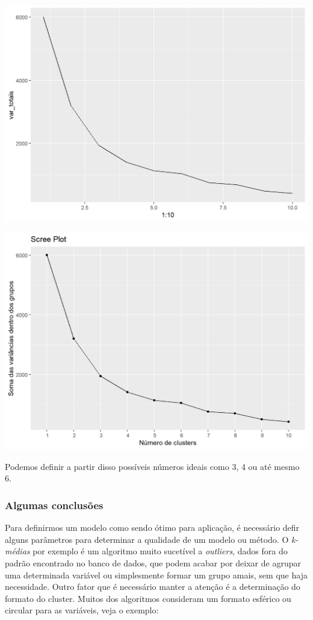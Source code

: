 \documentclass[
  letterpaper,
  DIV=11,
  numbers=noendperiod]{scrreprt}
\begin{document}
\includegraphics{./figuras_naosupervisionado/unnamed-chunk-17-1.png}

\includegraphics{./figuras_naosupervisionado/unnamed-chunk-17-2.png}

Podemos definir a partir disso possíveis números ideais como 3, 4 ou até
mesmo 6.

\hypertarget{algumas-conclusuxf5es-1}{%
\subsubsection{Algumas conclusões}\label{algumas-conclusuxf5es-1}}

Para definirmos um modelo como sendo ótimo para aplicação, é necessário
defir alguns parâmetros para determinar a qualidade de um modelo ou
método. O \emph{k-médias} por exemplo é um algoritmo muito sucetível a
\emph{outliers}, dados fora do padrão encontrado no banco de dados, que
podem acabar por deixar de agrupar uma determinada variável ou
simplesmente formar um grupo amais, sem que haja necessidade. Outro
fator que é necessário manter a atenção é a determinação do formato do
cluster. Muitos dos algoritmos consideram um formato esférico ou
circular para as variáveis, veja o exemplo:
\end{document}
